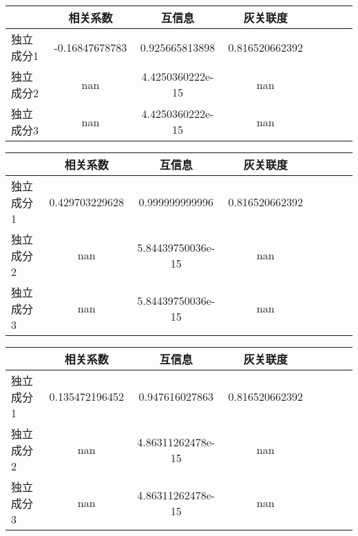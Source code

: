 \begin{table}[!tphb]  
\begin{center}
\begin{tabular}{lccclccc} 
 \toprule 
& 相关系数   & 互信息    &灰关联度 \\ 
\midrule 
独立成分1	& -0.16847678783	& 0.925665813898	& 0.816520662392	\\ 
独立成分2	& nan	& 4.4250360222e-15	& nan	\\ 
独立成分3	& nan	& 4.4250360222e-15	& nan	\\ 
\bottomrule 
 \end{tabular} 
\end{center} 
 \end{table} 


\begin{table}[!tphb]  
\begin{center}
\begin{tabular}{lccclccc} 
 \toprule 
& 相关系数   & 互信息    &灰关联度 \\ 
\midrule 
独立成分1	& 0.429703229628	& 0.999999999996	& 0.816520662392	\\ 
独立成分2	& nan	& 5.84439750036e-15	& nan	\\ 
独立成分3	& nan	& 5.84439750036e-15	& nan	\\ 
\bottomrule 
 \end{tabular} 
\end{center} 
 \end{table} 


\begin{table}[!tphb]  
\begin{center}
\begin{tabular}{lccclccc} 
 \toprule 
& 相关系数   & 互信息    &灰关联度 \\ 
\midrule 
独立成分1	& 0.135472196452	& 0.947616027863	& 0.816520662392	\\ 
独立成分2	& nan	& 4.86311262478e-15	& nan	\\ 
独立成分3	& nan	& 4.86311262478e-15	& nan	\\ 
\bottomrule 
 \end{tabular} 
\end{center} 
 \end{table} 

